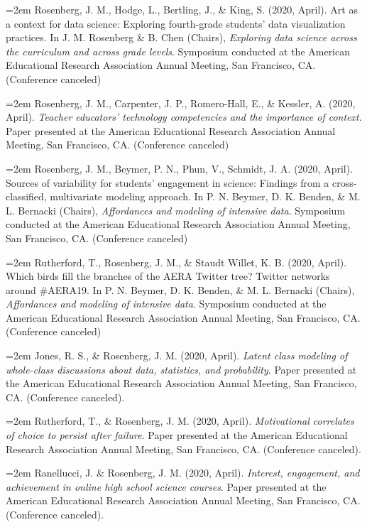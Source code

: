 \documentclass[
  14,
]{article}
\begin{document}
\hangindent=2em Rosenberg, J. M., Hodge, L., Bertling, J., \& King, S.
(2020, April). Art as a context for data science: Exploring fourth-grade
students' data visualization practices. In J. M. Rosenberg \& B. Chen
(Chairs), \emph{Exploring data science across the curriculum and across
grade levels}. Symposium conducted at the American Educational Research
Association Annual Meeting, San Francisco, CA. (Conference canceled)

\hangindent=2em Rosenberg, J. M., Carpenter, J. P., Romero-Hall, E., \&
Kessler, A. (2020, April). \emph{Teacher educators' technology
competencies and the importance of context}. Paper presented at the
American Educational Research Association Annual Meeting, San Francisco,
CA. (Conference canceled)

\hangindent=2em Rosenberg, J. M., Beymer, P. N., Phun, V., Schmidt, J.
A. (2020, April). Sources of variability for students' engagement in
science: Findings from a cross-classified, multivariate modeling
approach. In P. N. Beymer, D. K. Benden, \& M. L. Bernacki (Chairs),
\emph{Affordances and modeling of intensive data}. Symposium conducted
at the American Educational Research Association Annual Meeting, San
Francisco, CA. (Conference canceled)

\hangindent=2em Rutherford, T., Rosenberg, J. M., \& Staudt Willet, K.
B. (2020, April). Which birds fill the branches of the AERA Twitter
tree? Twitter networks around \#AERA19. In P. N. Beymer, D. K. Benden,
\& M. L. Bernacki (Chairs), \emph{Affordances and modeling of intensive
data}. Symposium conducted at the American Educational Research
Association Annual Meeting, San Francisco, CA. (Conference canceled)

\hangindent=2em Jones, R. S., \& Rosenberg, J. M. (2020, April).
\emph{Latent class modeling of whole-class discussions about data,
statistics, and probability}. Paper presented at the American
Educational Research Association Annual Meeting, San Francisco, CA.
(Conference canceled).

\hangindent=2em Rutherford, T., \& Rosenberg, J. M. (2020, April).
\emph{Motivational correlates of choice to persist after failure}. Paper
presented at the American Educational Research Association Annual
Meeting, San Francisco, CA. (Conference canceled).

\hangindent=2em Ranellucci, J. \& Rosenberg, J. M. (2020, April).
\emph{Interest, engagement, and achievement in online high school
science courses}. Paper presented at the American Educational Research
Association Annual Meeting, San Francisco, CA. (Conference canceled).
\end{document}
